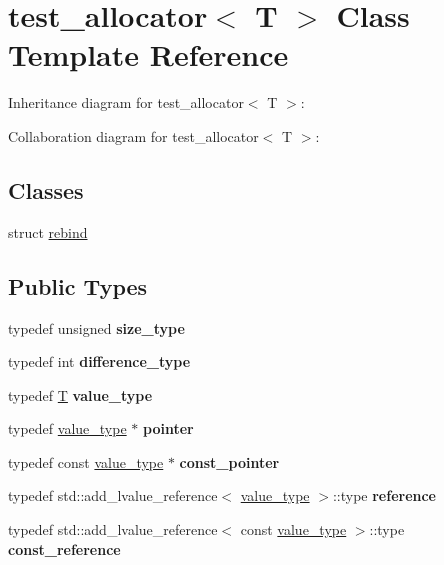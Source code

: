 \hypertarget{classtest__allocator}{}\section{test\+\_\+allocator$<$ T $>$ Class Template Reference}
\label{classtest__allocator}


Inheritance diagram for test\+\_\+allocator$<$ T $>$\+:


Collaboration diagram for test\+\_\+allocator$<$ T $>$\+:
\subsection*{Classes}
\begin{DoxyCompactItemize}
\item 
struct \mbox{\hyperlink{structtest__allocator_1_1rebind}{rebind}}
\end{DoxyCompactItemize}
\subsection*{Public Types}
\begin{DoxyCompactItemize}
\item 
\mbox{\label{classtest__allocator_adf041101a022154273be1d652835fa93}} 
typedef unsigned {\bfseries size\+\_\+type}
\item 
\mbox{\label{classtest__allocator_a97aa706a1fc84d21edd4557343e0ad37}} 
typedef int {\bfseries difference\+\_\+type}
\item 
\mbox{\label{classtest__allocator_aba6f0ac4c13aeb9dbf9c3cf106f03167}} 
typedef \mbox{\hyperlink{struct_t}{T}} {\bfseries value\+\_\+type}
\item 
\mbox{\label{classtest__allocator_aeeab199047dc2b573aec34e3cdc94751}} 
typedef \mbox{\hyperlink{struct_t}{value\+\_\+type}} $\ast$ {\bfseries pointer}
\item 
\mbox{\label{classtest__allocator_ac551ca128897e8bf564429f7a2eececa}} 
typedef const \mbox{\hyperlink{struct_t}{value\+\_\+type}} $\ast$ {\bfseries const\+\_\+pointer}
\item 
\mbox{\label{classtest__allocator_afdf4067616f6cea359d3f04c0ae818fc}} 
typedef std\+::add\+\_\+lvalue\+\_\+reference$<$ \mbox{\hyperlink{struct_t}{value\+\_\+type}} $>$\+::type {\bfseries reference}
\item 
\mbox{\label{classtest__allocator_a572d0510260d9b28e9d75137c6de5ba3}} 
typedef std\+::add\+\_\+lvalue\+\_\+reference$<$ const \mbox{\hyperlink{struct_t}{value\+\_\+type}} $>$\+::type {\bfseries const\+\_\+reference}
\end{DoxyCompactItemize}
